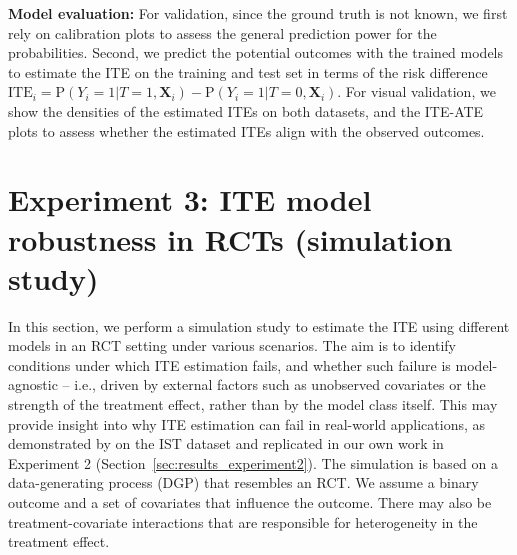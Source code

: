 \medskip

\textbf{Model evaluation: } For validation, since the ground truth is not known, we first rely on calibration plots to assess the general prediction power for the probabilities. Second, we predict the potential outcomes with the trained models to estimate the ITE on the training and test set in terms of the risk difference $\text{ITE}_i = \text{P}(Y_i=1|T=1, \mathbf{X}_i) - \text{P}(Y_i=1|T=0, \mathbf{X}_i)$. For visual validation, we show the densities of the estimated ITEs on both datasets, and the ITE-ATE plots to assess whether the estimated ITEs align with the observed outcomes.
















\section{Experiment 3: ITE model robustness in RCTs (simulation study)} \label{sec:methods_experiment3}

In this section, we perform a simulation study to estimate the ITE using different models in an RCT setting under various scenarios. The aim is to identify conditions under which ITE estimation fails, and whether such failure is model-agnostic -- i.e., driven by external factors such as unobserved covariates or the strength of the treatment effect, rather than by the model class itself. This may provide insight into why ITE estimation can fail in real-world applications, as demonstrated by \citet{chen2025} on the IST dataset and replicated in our own work in Experiment 2 (Section~\ref{sec:results_experiment2}). The simulation is based on a data-generating process (DGP) that resembles an RCT. We assume a binary outcome and a set of covariates that influence the outcome. There may also be treatment-covariate interactions that are responsible for heterogeneity in the treatment effect.

\medskip

